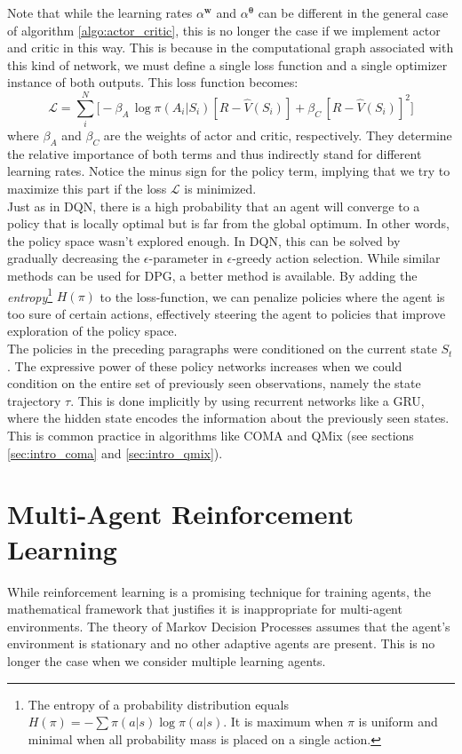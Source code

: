 Note that while the learning rates $\alpha^{\bm{w}}$ and $\alpha^{\bm{\theta}}$ can be different in the general case of algorithm \ref{algo:actor_critic}, this is no longer the case if we implement actor and critic in this way. This is because in the computational graph associated with this kind of network, we must define a single loss function and a single optimizer instance of both outputs. This loss function becomes:
\begin{equation}
    \mathcal{L} = \sum_i^N \Big [ -\beta_{A}\, \log \pi(A_i|S_i)[R - \hat V(S_i)] + \beta_{C}\, [R - \hat V(S_i)]^2 \Big ]
\end{equation}
where $\beta_{A}$ and $\beta_{C}$ are the weights of actor and critic, respectively. They determine the relative importance of both terms and thus indirectly stand for different learning rates. Notice the minus sign for the policy term, implying that we try to maximize this part if the loss $\mathcal{L}$ is minimized.\\

Just as in DQN, there is a high probability that an agent will converge to a policy that is locally optimal but is far from the global optimum. In other words, the policy space wasn't explored enough. In DQN, this can be solved by gradually decreasing the $\epsilon$-parameter in $\epsilon$-greedy action selection. While similar methods can be used for DPG, a better method is available. By adding the \emph{entropy}\footnote{The entropy of a probability distribution equals $H(\pi) = -\sum \pi(a|s) \log \pi(a|s)$. It is maximum when $\pi$ is uniform and minimal when all probability mass is placed on a single action.} $H(\pi)$ to the loss-function, we can penalize policies where the agent is too sure of certain actions, effectively steering the agent to policies that improve exploration of the policy space.\\

The policies in the preceding paragraphs were conditioned on the current state $S_t$. The expressive power of these policy networks increases when we could condition on the entire set of previously seen observations, namely the state trajectory $\tau$. This is done implicitly by using recurrent networks like a GRU, where the hidden state encodes the information about the previously seen states. This is common practice in algorithms like COMA and QMix (see sections \ref{sec:intro_coma} and \ref{sec:intro_qmix}).
\section{Multi-Agent Reinforcement Learning}
\label{sec:intro_marl}
While reinforcement learning is a promising technique for training agents, the mathematical framework that justifies it is inappropriate for multi-agent environments. The theory of Markov Decision Processes assumes that the agent's environment is stationary and no other adaptive agents are present. This is no longer the case when we consider multiple learning agents.\\


